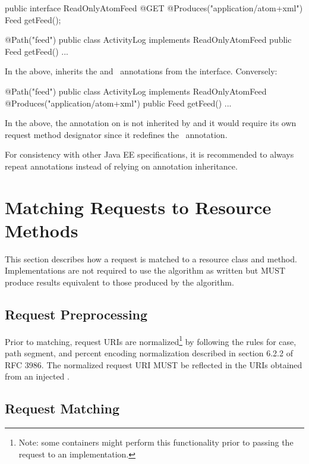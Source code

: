 \begin{listing}{1}
public interface ReadOnlyAtomFeed {
  @GET @Produces("application/atom+xml")
  Feed getFeed();
}

@Path("feed")
public class ActivityLog implements ReadOnlyAtomFeed {
  public Feed getFeed() {...}
}
\end{listing}

In the above,  inherits the  and \Produces\ annotations from the interface. Conversely:

\begin{listing}{1}
@Path("feed")
public class ActivityLog implements ReadOnlyAtomFeed {
  @Produces("application/atom+xml")
  public Feed getFeed() {...}
}
\end{listing}

In the above, the  annotation on  is not inherited by  and it would require its own request method designator since it redefines the \Produces\ annotation.

For consistency with other Java EE specifications, it is recommended to always repeat annotations instead of relying on annotation inheritance. 

\section{Matching Requests to Resource Methods}
\label{mapping_requests_to_java_methods}

This section describes how a request is matched to a resource class and method. Implementations are not required to use the algorithm as written but MUST produce results equivalent to those produced by the algorithm.

\subsection{Request Preprocessing}
\label{reqpreproc}

Prior to matching, request URIs are normalized\footnote{Note: some containers might perform this functionality prior to passing the request to an implementation.} by following the rules for case, path segment, and percent encoding normalization described in section 6.2.2 of RFC 3986\cite{uri}. The normalized request URI MUST be reflected in the URIs obtained from an injected .

\subsection{Request Matching}
\label{request_matching}

